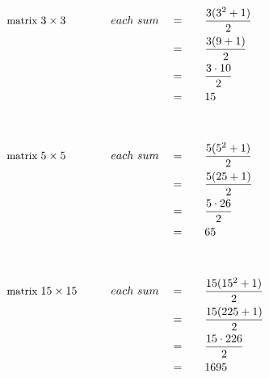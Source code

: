 \begin{alignat*}{5}
&\small\text{matrix }3\times3\normalsize\qquad&each~sum\quad&=\quad&&\frac{3(3^2+1)}{2}\\
&\,&\,&=&&\frac{3(9+1)}{2}\\
&\,&\,&=&&\frac{3\cdot10}{2}\\
&\,&\,&=&&15\\
\\ \\
&\small\text{matrix }5\times5\normalsize\qquad&each~sum\quad&=&&\frac{5(5^2+1)}{2}\\
&\,&\,&=&&\frac{5(25+1)}{2}\\
&\,&\,&=&&\frac{5\cdot26}{2}\\
&\,&\,&=&&65\\
\\ \\
&\small\text{matrix }15\times15\normalsize\qquad&each~sum\quad&=&&\frac{15(15^2+1)}{2}\\
&\,&\,&=&&\frac{15(225+1)}{2}\\
&\,&\,&=&&\frac{15\cdot226}{2}\\
&\,&\,&=&&1695
\end{alignat*}
